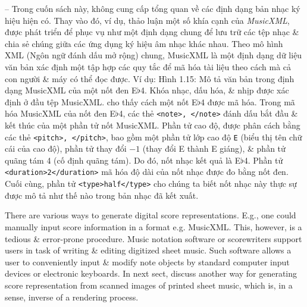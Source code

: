 \documentclass{article}
\begin{document}
\begin{itemize}
\begin{itemize}
\begin{itemize}
			-- Trong cuốn sách này, không cung cấp tổng quan về các định dạng bản nhạc ký hiệu hiện có. Thay vào đó, ví dụ, thảo luận một số khía cạnh của {\it MusicXML}, được phát triển để phục vụ như một định dạng chung để lưu trữ các tệp nhạc \& chia sẻ chúng giữa các ứng dụng ký hiệu âm nhạc khác nhau. Theo mô hình XML (Ngôn ngữ đánh dấu mở rộng) chung, MusicXML là một định dạng dữ liệu văn bản xác định một tập hợp các quy tắc để mã hóa tài liệu theo cách mà cả con người \& máy có thể đọc được. Ví dụ: {\sf Hình 1.15: Mô tả văn bản trong định dạng MusicXML của một nốt đen E$\flat$4. Khóa nhạc, dấu hóa, \& nhịp được xác định ở đầu tệp MusicXML.} cho thấy cách một nốt E$\flat$4 được mã hóa. Trong mã hóa MusicXML của nốt đen E$\flat$4, các thẻ \verb|<note>, </note>| đánh dấu bắt đầu \& kết thúc của một phần tử nốt MusicXML. Phần tử cao độ, được phân cách bằng các thẻ \verb|<pitch>, </pitch>|, bao gồm một phần tử lớp cao độ {\tt E} (biểu thị tên chữ cái của cao độ), phần tử thay đổi $-1$ (thay đổi E thành E giáng), \& phần tử quãng tám 4 (cố định quãng tám). Do đó, nốt nhạc kết quả là E$\flat$4. Phần tử \verb|<duration>2</duration>| mã hóa độ dài của nốt nhạc được đo bằng nốt đen. Cuối cùng, phần tử \verb|<type>half</type>| cho chúng ta biết nốt nhạc này thực sự được mô tả như thế nào trong bản nhạc đã kết xuất.
			
			There are various ways to generate digital score representations. E.g., one could manually input score information in a format e.g. MusicXML. This, however, is a tedious \& error-prone procedure. Music notation software or scorewriters support users in task of writing \& editing digitized sheet music. Such software allows a user to conveniently input \& modify note objects by standard computer input devices or electronic keyboards. In next sect, discuss another way for generating score representation from scanned images of printed sheet music, which is, in a sense, inverse of a rendering process.
			

\end{itemize}
\end{itemize}
\end{itemize}
\end{document}

